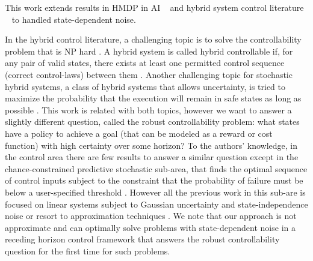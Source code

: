 

This work extends results in HMDP in AI
~\cite{boyan01,feng04,li05,kveton06,phase07,hao09,sdp_aaai} and hybrid
system control literature ~\cite{Henzinger:1997,Hu:2000,DeSHee:2009}
to handled state-dependent noise.

In the hybrid control literature, a challenging topic is to solve the
controllability problem that is NP hard \cite{Blondel:1999}. A hybrid
system is called hybrid controllable if, for any pair of valid states,
there exists at least one permitted control sequence (correct
control-laws) between them \cite{Tittus:1998,Yang:2007}.  Another
challenging topic for stochastic hybrid systems, a class of hybrid
systems that allows uncertainty, is tried to maximize the probability
that the execution will remain in safe states as long as
possible \cite{Hu:2000}.  This work is related with both topics,
however we want to answer a slightly different question, called the
robust controllability problem: what states have a policy to achieve a
goal (that can be modeled as a reward or cost function) with high
certainty over some horizon?  To the authors’ knowledge, in the
control area there are few results to answer a similar question except
in the chance-constrained predictive stochastic sub-area, that finds
the optimal sequence of control inputs subject to the constraint that
the probability of failure must be below a user-specified
threshold \cite{Blackmore:2011}. However all the previous work in this
sub-are is focused on linear systems subject to Gaussian uncertainty
and state-independence
noise \cite{Schwarm:1999,Li:2002,Ono:2008,Blackmore:2011} or resort to
approximation techniques \cite{Blackmore:2010}.  We note that 
our approach is not approximate and can optimally solve problems with
state-dependent noise in a receding horizon control framework that
answers the robust controllability question for the first time for such
problems.

 
 




